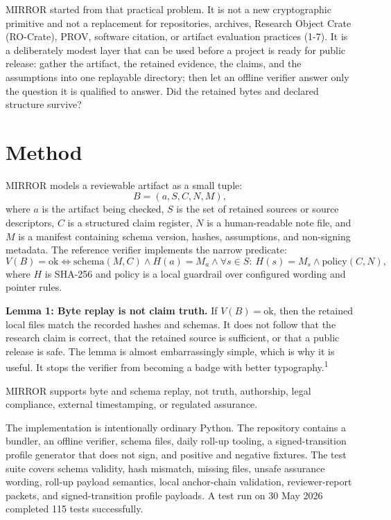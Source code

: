 \documentclass[10pt]{article}
\newcommand{\note}[1]{\textsuperscript{#1}}
\newcommand{\mirror}{MIRROR}
\begin{document}
\mirror{} started from that practical problem. It is not a new cryptographic primitive and not a replacement for repositories, archives, Research Object Crate (RO-Crate), PROV, software citation, or artifact evaluation practices (1-7). It is a deliberately modest layer that can be used before a project is ready for public release: gather the artifact, the retained evidence, the claims, and the assumptions into one replayable directory; then let an offline verifier answer only the question it is qualified to answer. Did the retained bytes and declared structure survive?

\section{Method}

\mirror{} models a reviewable artifact as a small tuple:
\[
B = (a, S, C, N, M),
\]
where \(a\) is the artifact being checked, \(S\) is the set of retained sources or source descriptors, \(C\) is a structured claim register, \(N\) is a human-readable note file, and \(M\) is a manifest containing schema version, hashes, assumptions, and non-signing metadata. The reference verifier implements the narrow predicate:
\[
V(B)=\mathrm{ok} \Longleftrightarrow
\mathrm{schema}(M,C) \land H(a)=M_a \land
\forall s\in S:\ H(s)=M_s \land \mathrm{policy}(C,N),
\]
where \(H\) is SHA-256 and \(\mathrm{policy}\) is a local guardrail over configured wording and pointer rules.

\textbf{Lemma 1: Byte replay is not claim truth.} If \(V(B)=\mathrm{ok}\), then the retained local files match the recorded hashes and schemas. It does not follow that the research claim is correct, that the retained source is sufficient, or that a public release is safe. The lemma is almost embarrassingly simple, which is why it is useful. It stops the verifier from becoming a badge with better typography.\note{1}

\mirror{} supports byte and schema replay, not truth, authorship, legal compliance, external timestamping, or regulated assurance.

The implementation is intentionally ordinary Python. The repository contains a bundler, an offline verifier, schema files, daily roll-up tooling, a signed-transition profile generator that does not sign, and positive and negative fixtures. The test suite covers schema validity, hash mismatch, missing files, unsafe assurance wording, roll-up payload semantics, local anchor-chain validation, reviewer-report packets, and signed-transition profile payloads. A test run on 30 May 2026 completed 115 tests successfully.
\end{document}
